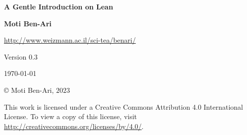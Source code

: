 


\thispagestyle{empty}

\begin{center}
\textbf{\LARGE A Gentle Introduction on Lean}

\bigskip
\bigskip
\bigskip

\textbf{\Large Moti Ben-Ari}

\bigskip

\url{http://www.weizmann.ac.il/sci-tea/benari/}

\bigskip
\bigskip
\bigskip

Version $0.3$

\bigskip

\today

\end{center}

\vfill

\begin{center}
\copyright{} Moti Ben-Ari, $2023$
\end{center}
 
\begin{small}
This work is licensed under a Creative Commons Attribution 4.0 International License. To view a copy of this license, visit \url{http://creativecommons.org/licenses/by/4.0/}.
\end{small}

\newpage

\tableofcontents

\newpage


